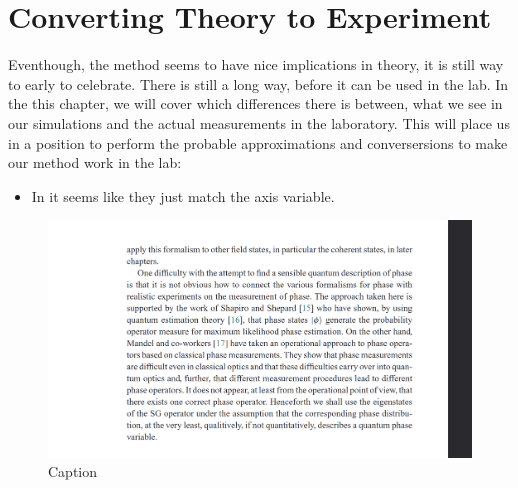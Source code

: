 \chapter{Converting Theory to Experiment}
Eventhough, the method seems to have nice implications in theory, it is still way to early to celebrate. There is still a long way, before it can be used in the lab. In the this chapter, we will cover which differences there is between, what we see in our simulations and the actual measurements in the laboratory. This will place us in a position to perform the probable approximations and conversersions to make our method work in the lab:

\begin{itemize}
    \item In \cite{ikonen_qubit_2019} it seems like they just match the axis variable.  
\end{itemize}

\begin{figure}
    \centering
    \includegraphics{Figs/insert_from_quantum_optics.png}
    \caption{Caption}
    \label{fig:my_label}
\end{figure}